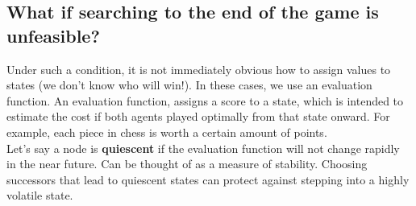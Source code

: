 \documentclass[letterpaper]{article} %
\begin{document}
\subsection{What if searching to the end of the game is unfeasible?}

Under such a condition, it is not immediately obvious how to assign values to states (we don't know who will win!). In these cases, we use an evaluation function. An evaluation function, assigns a score to a state, which is intended to estimate the cost if both agents played optimally from that state onward. For example, each piece in chess is worth a certain amount of points.\\

Let's say a node is \textbf{quiescent} if the evaluation function will not change rapidly in the near future. Can be thought of as a measure of stability. Choosing successors that lead to quiescent states can protect against stepping into a highly volatile state.
\end{document}
